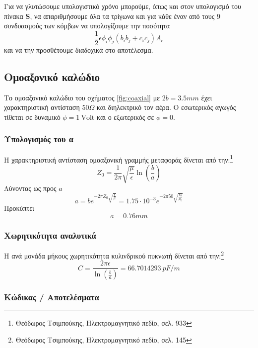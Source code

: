 \documentclass[10pt, letterpaper]{article}
\newcommand{\en}{\selectlanguage{english}}
\newcommand{\gr}{\selectlanguage{greek}}
\begin{document}
Για να γλυτώσουμε υπολογιστικό χρόνο μπορούμε, όπως και στον υπολογισμό του πίνακα $\mathbf{S}$, να απαριθμήσουμε όλα τα 
τρίγωνα και για κάθε έναν από τους $9$ συνδυασμούς των κόμβων να υπολογίζουμε την ποσότητα 
\[ \frac{1}{2} \epsilon  \phi_i \phi_j  (b_ib_j + c_ic_j) A_e   \]
και να την προσθέτουμε διαδοχικά στο αποτέλεσμα. 












\subsection*{Ομοαξονικό καλώδιο}

Το ομοαξονικό καλώδιο του σχήματος \ref{fig:coaxial} με $2b = 3.5 mm $ έχει χαρακτηριστική αντίσταση $50 \Omega$ και διηλεκτρικό 
τον αέρα. Ο εσωτερικός αγωγός τίθεται σε δυναμικό \en $\phi = 1 \ \text{Volt}$ \gr και ο εξωτερικός σε $\phi = 0$.

\subsubsection*{Υπολογισμός του α}


Η χαρακτηριστική αντίσταση ομοαξονική γραμμής μεταφοράς δίνεται από την:\footnote{Θεόδωρος Τσιμπούκης, Ηλεκτρομαγνητικό πεδίο, σελ. 933}
\[ Z_0 = \frac{1}{2 \pi}\sqrt{\frac{\mu}{\epsilon}} \ln (\frac{b}{a})  \]
Λύνοντας ως προς $a$
\[ a = b e^{-2\pi Z_0 \sqrt{\frac{\epsilon}{\mu}}}  = 1.75 \cdot 10^{-3} e^{-2\pi 50 \sqrt{\frac{\epsilon_0}{\mu_0}}}\]
Προκύπτει
\[a = 0.76 mm\]



\subsubsection*{Χωρητικότητα αναλυτικά }

Η ανά μονάδα μήκους χωρητικότητα κυλινδρικού πυκνωτή δίνεται από την:\footnote{Θεόδωρος Τσιμπούκης, Ηλεκτρομαγνητικό πεδίο, σελ. 145}
\begin{equation} \label{eq:analytical_capacitance_coaxial}
  C = \frac{2 \pi \epsilon}{\ln (\frac{b}{a})} =  66.7014293 \ pF/m
\end{equation}


\subsubsection*{Κώδικας / Αποτελέσματα}
\end{document}
